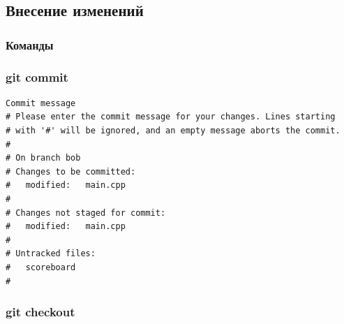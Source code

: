 \documentclass[pdf,russian]{beamer}
\begin{document}
\subsection{Внесение изменений}
\begin{frame}
    \frametitle{Команды}
\end{frame}

\begin{frame}[fragile]
    \frametitle{git commit}
    \begin{block}{}
        \begin{verbatim}
Commit message
# Please enter the commit message for your changes. Lines starting
# with '#' will be ignored, and an empty message aborts the commit.
#
# On branch bob
# Changes to be committed:
#	modified:   main.cpp
#
# Changes not staged for commit:
#	modified:   main.cpp
#
# Untracked files:
#	scoreboard
#
        \end{verbatim}
    \end{block}
\end{frame}

\begin{frame}
    \frametitle{git checkout}
    \center
\end{frame}
\end{document}
